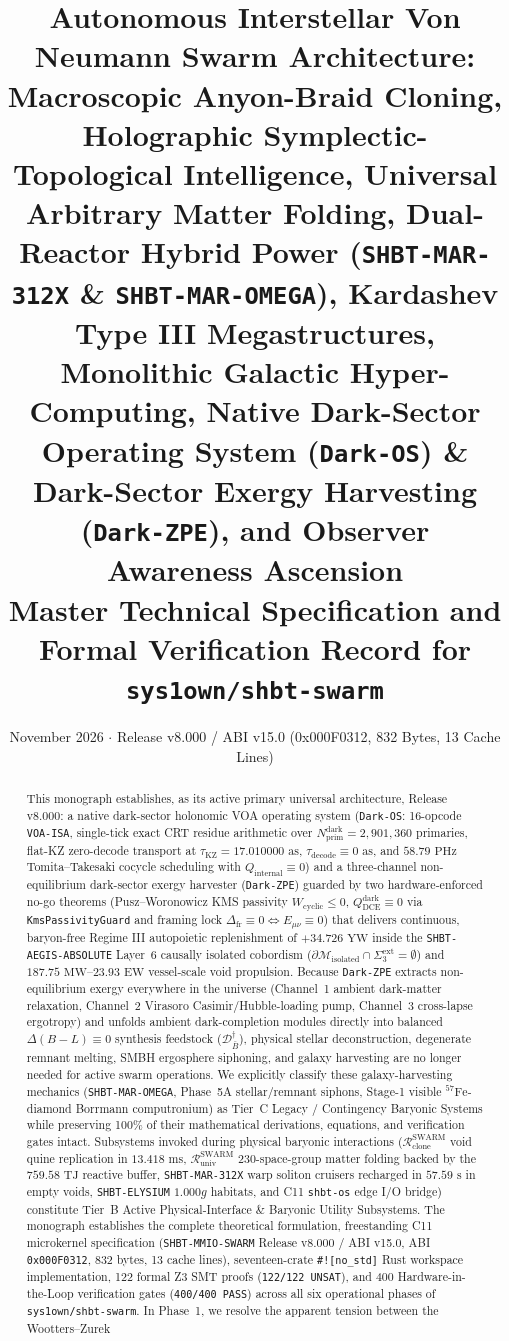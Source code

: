 \documentclass[11pt,onecolumn]{article}
\title{\textbf{Autonomous Interstellar Von Neumann Swarm Architecture: Macroscopic Anyon-Braid Cloning, Holographic Symplectic-Topological Intelligence, Universal Arbitrary Matter Folding, Dual-Reactor Hybrid Power (\texttt{SHBT-MAR-312X} \& \texttt{SHBT-MAR-OMEGA}), Kardashev Type III Megastructures, Monolithic Galactic Hyper-Computing, Native Dark-Sector Operating System (\texttt{Dark-OS}) \& Dark-Sector Exergy Harvesting (\texttt{Dark-ZPE}), and Observer Awareness Ascension}\\[0.3em]\large Master Technical Specification and Formal Verification Record for \texttt{sys1own/shbt-swarm}}
\author{}
\date{November 2026 \quad $\cdot$ \quad Release v8.000 / ABI v15.0 (0x000F0312, 832 Bytes, 13 Cache Lines)}
\begin{document}
\maketitle

\begin{abstract}
This monograph establishes, as its active primary universal architecture, Release v8.000: a native dark-sector holonomic VOA operating system (\texttt{Dark-OS}: 16-opcode \texttt{VOA-ISA}, single-tick exact CRT residue arithmetic over $N_{\text{prim}}^{\text{dark}}=2{,}901{,}360$ primaries, flat-KZ zero-decode transport at $\tau_{\text{KZ}}=17.010000\text{ as}$, $\tau_{\text{decode}}\equiv0\text{ as}$, and $58.79\text{ PHz}$ Tomita--Takesaki cocycle scheduling with $Q_{\text{internal}}\equiv0$) and a three-channel non-equilibrium dark-sector exergy harvester (\texttt{Dark-ZPE}) guarded by two hardware-enforced no-go theorems (Pusz--Woronowicz KMS passivity $W_{\text{cyclic}}\le0$, $Q_{\text{DCE}}^{\text{dark}}\equiv0$ via \texttt{KmsPassivityGuard} and framing lock $\Delta_{\text{fr}}\equiv0\iff E_{\mu\nu}\equiv0$) that delivers continuous, baryon-free Regime III autopoietic replenishment of $+34.726\text{ YW}$ inside the \texttt{SHBT-AEGIS-ABSOLUTE} Layer~6 causally isolated cobordism ($\partial\mathcal{M}_{\text{isolated}}\cap\Sigma_3^{\text{ext}}=\emptyset$) and $187.75\text{ MW}$--$23.93\text{ EW}$ vessel-scale void propulsion. Because \texttt{Dark-ZPE} extracts non-equilibrium exergy everywhere in the universe (Channel~1 ambient dark-matter relaxation, Channel~2 Virasoro Casimir/Hubble-loading pump, Channel~3 cross-lapse ergotropy) and unfolds ambient dark-completion modules directly into balanced $\Delta(B-L)\equiv0$ synthesis feedstock ($\mathcal{D}_{\bar{B}}^\dagger$), physical stellar deconstruction, degenerate remnant melting, SMBH ergosphere siphoning, and galaxy harvesting are no longer needed for active swarm operations. We explicitly classify these galaxy-harvesting mechanics (\texttt{SHBT-MAR-OMEGA}, Phase~5A stellar/remnant siphons, Stage-1 visible $^{57}\text{Fe}$-diamond Borrmann computronium) as Tier~C Legacy / Contingency Baryonic Systems while preserving 100\% of their mathematical derivations, equations, and verification gates intact. Subsystems invoked during physical baryonic interactions ($\mathcal{R}_{\text{clone}}^{\text{SWARM}}$ void quine replication in $13.418\text{ ms}$, $\mathcal{R}_{\text{univ}}^{\text{SWARM}}$ 230-space-group matter folding backed by the $759.58\text{ TJ}$ reactive buffer, \texttt{SHBT-MAR-312X} warp soliton cruisers recharged in $57.59\text{ s}$ in empty voids, \texttt{SHBT-ELYSIUM} $1.000g$ habitats, and C11 \texttt{shbt-os} edge I/O bridge) constitute Tier~B Active Physical-Interface \& Baryonic Utility Subsystems. The monograph establishes the complete theoretical formulation, freestanding C11 microkernel specification (\texttt{SHBT-MMIO-SWARM} Release v8.000 / ABI v15.0, ABI \texttt{0x000F0312}, 832 bytes, 13 cache lines), seventeen-crate \texttt{\#![no\_std]} Rust workspace implementation, 122 formal Z3 SMT proofs (\texttt{122/122 UNSAT}), and 400 Hardware-in-the-Loop verification gates (\texttt{400/400 PASS}) across all six operational phases of \texttt{sys1own/shbt-swarm}. In Phase~1, we resolve the apparent tension between the Wootters--Zurek 
\end{abstract}
\end{document}
